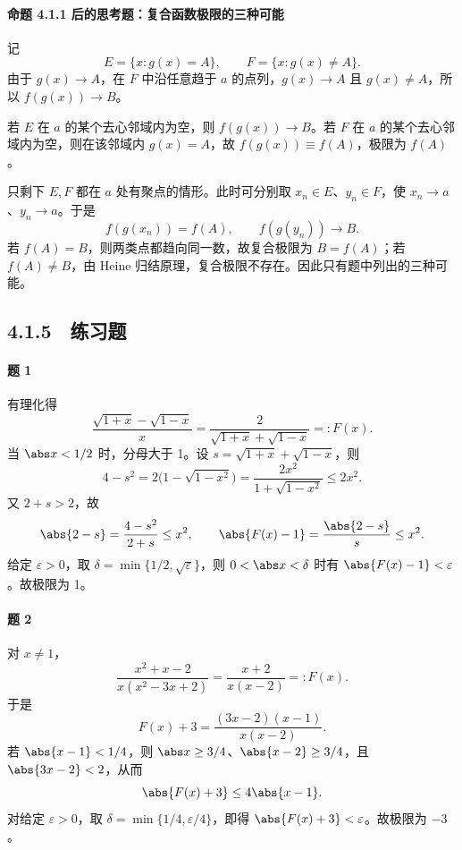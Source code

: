 \paragraph{命题 4.1.1 后的思考题：复合函数极限的三种可能}
\begin{xsolution}
记
\[
  E=\{x:g(x)=A\},\qquad F=\{x:g(x)\ne A\}.
\]
由于 $g(x)\to A$，在 $F$ 中沿任意趋于 $a$ 的点列，$g(x)\to A$ 且 $g(x)\ne A$，所以
$f(g(x))\to B$。

若 $E$ 在 $a$ 的某个去心邻域内为空，则 $f(g(x))\to B$。若 $F$ 在 $a$ 的某个去心邻域内为空，则在该邻域内 $g(x)=A$，故 $f(g(x))\equiv f(A)$，极限为 $f(A)$。

只剩下 $E,F$ 都在 $a$ 处有聚点的情形。此时可分别取 $x_n\in E$、$y_n\in F$，使 $x_n\to a$、$y_n\to a$。于是
\[
  f(g(x_n))=f(A),\qquad f(g(y_n))\to B.
\]
若 $f(A)=B$，则两类点都趋向同一数，故复合极限为 $B=f(A)$；若 $f(A)\ne B$，由 Heine 归结原理，复合极限不存在。因此只有题中列出的三种可能。
\end{xsolution}

\subsection*{4.1.5　练习题}

\paragraph{题 1}
\begin{xsolution}
有理化得
\[
  \frac{\sqrt{1+x}-\sqrt{1-x}}x
  =\frac{2}{\sqrt{1+x}+\sqrt{1-x}}=:F(x).
\]
当 $\abs x<1/2$ 时，分母大于 1。设
$s=\sqrt{1+x}+\sqrt{1-x}$，则
\[
  4-s^2=2\bigl(1-\sqrt{1-x^2}\bigr)
  =\frac{2x^2}{1+\sqrt{1-x^2}}\leq2x^2.
\]
又 $2+s>2$，故
\[
  \abs{2-s}=\frac{4-s^2}{2+s}\leq x^2,
  \qquad
  \abs{F(x)-1}=\frac{\abs{2-s}}s\leq x^2.
\]
给定 $\varepsilon>0$，取
$\delta=\min\{1/2,\sqrt\varepsilon\}$，则 $0<\abs x<\delta$ 时有 $\abs{F(x)-1}<\varepsilon$。故极限为 1。
\end{xsolution}

\paragraph{题 2}
\begin{xsolution}
对 $x\ne1$，
\[
  \frac{x^2+x-2}{x(x^2-3x+2)}
  =\frac{x+2}{x(x-2)}=:F(x).
\]
于是
\[
  F(x)+3=\frac{(3x-2)(x-1)}{x(x-2)}.
\]
若 $\abs{x-1}<1/4$，则 $\abs x\geq3/4$、$\abs{x-2}\geq3/4$，且 $\abs{3x-2}<2$，从而
\[
  \abs{F(x)+3}\leq4\abs{x-1}.
\]
对给定 $\varepsilon>0$，取
$\delta=\min\{1/4,\varepsilon/4\}$，即得 $\abs{F(x)+3}<\varepsilon$。故极限为 $-3$。
\end{xsolution}


